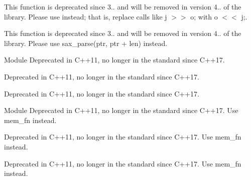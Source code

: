 \begin{DoxyRefList}
\item[Member \doxylink{classnlohmann_1_1basic__json_abfcb46247e0d5ec0a442c3193c5305be}{nlohmann\+::basic\+\_\+json\texorpdfstring{$<$}{<} Object\+Type, Array\+Type, String\+Type, Boolean\+Type, Number\+Integer\+Type, Number\+Unsigned\+Type, Number\+Float\+Type, Allocator\+Type, JSONSerializer, Binary\+Type \texorpdfstring{$>$}{>}\+::operator\texorpdfstring{$>$}{>}\texorpdfstring{$>$}{>}} (const \doxylink{classnlohmann_1_1basic__json}{basic\+\_\+json} \&j, std\+::ostream \&o)]\label{deprecated__deprecated000003}%
%
This function is deprecated since 3.. and will be removed in version 4.. of the library. Please use  instead; that is, replace calls like {\ttfamily j \texorpdfstring{$>$}{>}\texorpdfstring{$>$}{>} o;} with {\ttfamily o \texorpdfstring{$<$}{<}\texorpdfstring{$<$}{<} j;}.  
\item[Member \doxylink{classnlohmann_1_1basic__json_aef9ef0a817ecde8bf270653e8706c150}{nlohmann\+::basic\+\_\+json\texorpdfstring{$<$}{<} Object\+Type, Array\+Type, String\+Type, Boolean\+Type, Number\+Integer\+Type, Number\+Unsigned\+Type, Number\+Float\+Type, Allocator\+Type, JSONSerializer, Binary\+Type \texorpdfstring{$>$}{>}\+::sax\+\_\+parse} (detail\+::span\+\_\+input\+\_\+adapter \&\&i, SAX \texorpdfstring{$\ast$}{*}sax, input\+\_\+format\+\_\+t format=input\+\_\+format\+\_\+t\+::json, const bool strict=true, const bool ignore\+\_\+comments=false)]\label{deprecated__deprecated000004}%
%
This function is deprecated since 3.. and will be removed in version 4.. of the library. Please use sax\+\_\+parse(ptr, ptr + len) instead.  
\item[Module \doxylink{group__pointer__adaptors}{pointer\+\_\+adaptors} ]\label{deprecated__deprecated000012}%
%
Deprecated in C++11, no longer in the standard since C++17.

\label{deprecated__deprecated000028}%
%
Deprecated in C++11, no longer in the standard since C++17.

\label{deprecated__deprecated000042}%
%
Deprecated in C++11, no longer in the standard since C++17. 
\item[Module \doxylink{group__ptrmem__adaptors}{ptrmem\+\_\+adaptors} ]\label{deprecated__deprecated000029}%
%
Deprecated in C++11, no longer in the standard since C++17. Use {\ttfamily mem\+\_\+fn} instead.

\label{deprecated__deprecated000013}%
%
Deprecated in C++11, no longer in the standard since C++17. Use {\ttfamily mem\+\_\+fn} instead.

\label{deprecated__deprecated000043}%
%
Deprecated in C++11, no longer in the standard since C++17. Use {\ttfamily mem\+\_\+fn} instead.
\end{DoxyRefList}
